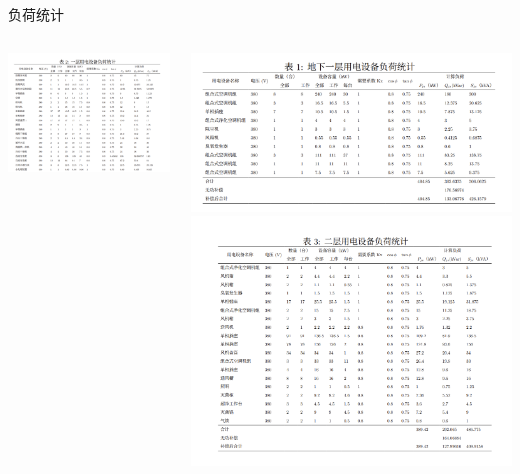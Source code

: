 \documentclass{beamer}
\begin{document}
    \begin{frame}{负荷统计}{\thesection \, \secname}
        \begin{columns}
            \begin{column}{0.4\textwidth}
                \includegraphics[width=\textwidth]{gallery/1.png}
            \end{column}
            \begin{column}{0.4\textwidth}
                \includegraphics[width=\textwidth]{gallery/2.png}
                \includegraphics[width=\textwidth]{gallery/3.png}
            \end{column}
        \end{columns}

    \end{frame}
\end{document}
